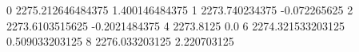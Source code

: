 0 2275.212646484375 1.400146484375
1 2273.740234375 -0.072265625
2 2273.6103515625 -0.2021484375
4 2273.8125 0.0
6 2274.321533203125 0.509033203125
8 2276.033203125 2.220703125
